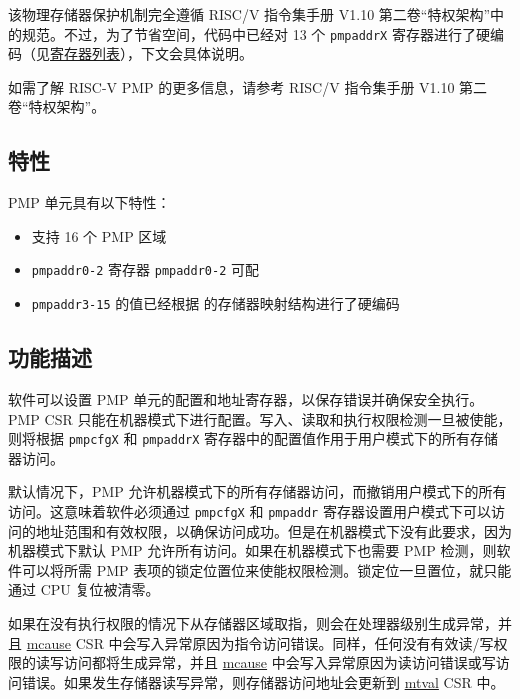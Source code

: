 \documentclass[main\_\_CN.tex]{subfiles}
\begin{document}
该物理存储器保护机制完全遵循 RISC\-/V 指令集手册 V1.10 第二卷“特权架构”中的规范。不过，为了节省空间，代码中已经对 13 个 \texttt{pmpaddrX} 寄存器进行了硬编码（见\hyperref[sec:riscvcpu-pmp-reg-summ]{寄存器列表}），下文会具体说明。

如需了解 RISC-V PMP 的更多信息，请参考 RISC\-/V 指令集手册 V1.10 第二卷“特权架构”。

\subsection{特性}
\label{sec:riscvcpu-pmp-features}
PMP 单元具有以下特性：

\begin{itemize}
    \item 支持 16 个 PMP 区域
    \item \texttt{pmpaddr0-2} 寄存器 \texttt{pmpaddr0-2} 可配
    \item \texttt{pmpaddr3-15} 的值已经根据 \chipname{} 的存储器映射结构进行了硬编码
\end{itemize}

\subsection{功能描述}
\label{sec:riscvcpu-pmp-func-descr}

软件可以设置 PMP 单元的配置和地址寄存器，以保存错误并确保安全执行。PMP CSR 只能在机器模式下进行配置。写入、读取和执行权限检测一旦被使能，则将根据 \texttt{pmpcfgX} 和 \texttt{pmpaddrX} 寄存器中的配置值作用于用户模式下的所有存储器访问。

默认情况下，PMP 允许机器模式下的所有存储器访问，而撤销用户模式下的所有访问。这意味着软件必须通过 \texttt{pmpcfgX} 和 \texttt{pmpaddr} 寄存器设置用户模式下可以访问的地址范围和有效权限，以确保访问成功。但是在机器模式下没有此要求，因为机器模式下默认 PMP 允许所有访问。如果在机器模式下也需要 PMP 检测，则软件可以将所需 PMP 表项的锁定位置位来使能权限检测。锁定位一旦置位，就只能通过 CPU 复位被清零。

如果在没有执行权限的情况下从存储器区域取指，则会在处理器级别生成异常，并且 \hyperref[regdesc:MCAUSE]{mcause} CSR 中会写入异常原因为指令访问错误。同样，任何没有有效读/写权限的读写访问都将生成异常，并且 \hyperref[regdesc:MCAUSE]{mcause} 中会写入异常原因为读访问错误或写访问错误。如果发生存储器读写异常，则存储器访问地址会更新到 \hyperref[regdesc:MTVAL]{mtval} CSR 中。

\end{document}
